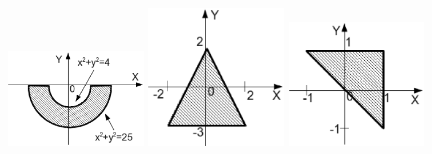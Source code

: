 \begin{figure}[h]%
\begin{floatrow}[3]
{\includegraphics[width=0.32\textwidth,keepaspectratio]{img/ris_3_67}}
{\includegraphics[width=0.32\textwidth,keepaspectratio]{img/ris_3_68}}
{\includegraphics[width=0.32\textwidth,keepaspectratio]{img/ris_3_69}}
\end{floatrow}
\end{figure}%

